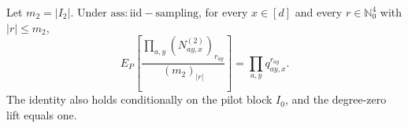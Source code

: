 Let \(m_2=\lvert I_2\rvert\).  Under \(\mathrm{ass:iid-sampling}\), for every \(x\in[d]\) and every \(r\in\mathbb N_0^4\) with \(\lvert r\rvert\le m_2\),
\[
 E_P\!\left[
   \frac{\prod_{a,y}(N^{(2)}_{ay,x})_{r_{ay}}}{(m_2)_{\lvert r\rvert}}
 \right]
 =\prod_{a,y}q_{ay,x}^{r_{ay}}.
\]
The identity also holds conditionally on the pilot block \(I_0\), and the degree-zero lift equals one.